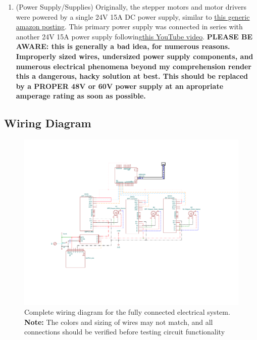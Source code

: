 \documentclass[12pt,oneside,letterpaper]{article}
\begin{document}
\begin{enumerate}
\item(Power Supply/Supplies) Originally, the stepper motors and motor drivers were powered by a single 24V 15A DC power supply, similar to \href{https://www.amazon.com/Switching-SJHPRMXF-Universal-Regulated-Transformer/dp/B0BWC8J2HY/ref=sr_1_4?crid=2KFHB4ZPW918C&dib=eyJ2IjoiMSJ9.FPK3xtReWIHdljtMiM5tJdXhBQ5q_-IO-pflt5CI00iFDB9iYGMc79Ty_FO0dvSjdtl0D0Zih9khd_51xjQamVo7iaApGN1fatpqVmezqN7-BDClRtcv_gsEr8ofznzE0bb5uG-HI-YOc7R0-aT_jQXBuObvvQguQbhkOHwR9Rz7JSEfk6LCDIEusBev-jj4meyV8GGQBtdx2AE4DfrnhkPKcfrdVDSSCgHEC-I6Ccjzjrr8_a77e0xSFJ9ziQedmuPHjgInys8orLajkbVt0rwaIr624xeHIuU9LhTWBNQ.29UMZP6yEU8jGo2FBFcXFL1GxivPtxQHOTDhLT26qvg&}{this generic amazon posting}. This primary power supply was connected in series with another 24V 15A power supply following\href{https://www.youtube.com/watch?v=jbzb66dCbOc}{this YouTube video}. \textbf{PLEASE BE AWARE: this is generally a bad idea, for numerous reasons. Improperly sized wires, undersized power supply components, and numerous electrical phenomena beyond my comprehension render this a dangerous, hacky solution at best. This should be replaced by a PROPER 48V or 60V power supply at an apropriate amperage rating as soon as possible.}

\end{enumerate}
\begin{landscape}
\subsection{Wiring Diagram}
\begin{figure}[h!]
\centering
\includegraphics[width=\textwidth, trim=3.5cm 4.5cm 5.0cm 2.5cm, clip,scale=1.5]{Print Schematic_R7.pdf}
\caption{Complete wiring diagram for the fully connected electrical system. \textbf{Note:} The colors and sizing of wires may not match, and all connections should be verified before testing circuit functionality}
\end{figure}
\end{landscape}
\newpage
\end{document}
